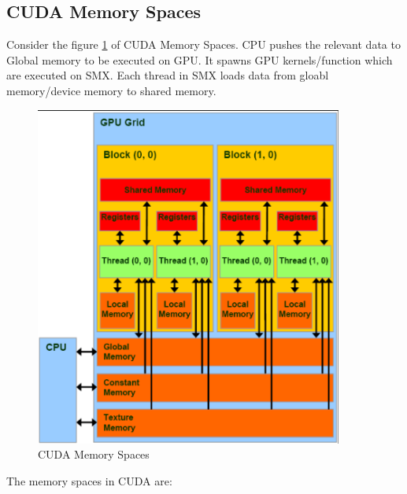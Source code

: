 \documentclass[12pt]{article}
\begin{document}
\subsection{CUDA Memory Spaces}
Consider the figure \ref{fig:cuda_memory} of CUDA Memory Spaces. CPU pushes the relevant data to Global memory to be executed on GPU.
It spawns GPU kernels/function which are executed on SMX. Each thread in SMX loads data from gloabl memory/device memory to shared memory.
\begin{figure}[H]
    \centering
    \includegraphics[width=0.9\textwidth]{images/cuda_memory.png}
    \caption{CUDA Memory Spaces}
    \label{fig:cuda_memory}
\end{figure}
The memory spaces in CUDA are:
\end{document}
